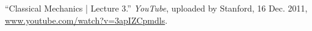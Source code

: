 \begin{thebibliography}{12}





“Classical Mechanics | Lecture 3.” \emph{YouTube}, uploaded by Stanford, 16 Dec. 2011, \url{www.youtube.com/watch?v=3apIZCpmdls}.








\end{thebibliography}

